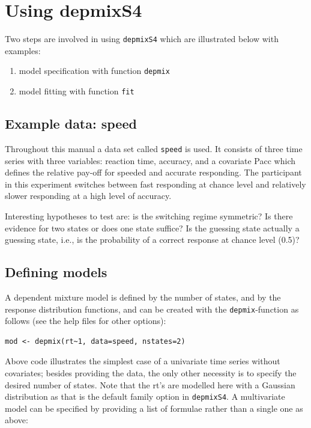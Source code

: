 \documentclass[a4paper]{article}
\newcommand{\pkg}{\texttt}
\newcommand{\code}{\texttt}
\begin{document}
\section{Using depmixS4}

Two steps are involved in using \pkg{depmixS4} which are illustrated
below with examples:
\begin{enumerate}
	\item model specification with function \code{depmix}
	
	\item  model fitting with function \code{fit}
\end{enumerate}

\subsection{Example data: speed}

Throughout this manual a data set called \code{speed} is used.  It
consists of three time series with three variables: reaction time,
accuracy, and a covariate Pacc which defines the relative pay-off for
speeded and accurate responding. The participant in this experiment 
switches between fast responding at chance level and relatively 
slower responding at a high level of accuracy. 

Interesting hypotheses to test are: is the switching regime symmetric?
Is there evidence for two states or does one state suffice?  Is the
guessing state actually a guessing state, i.e., is the probability
of a correct response at chance level (0.5)?


\subsection{Defining models}

A dependent mixture model is defined by the number of states, and by
the response distribution functions, and can be created with the
\code{depmix}-function as follows (see the help files for other
options):

\begin{verbatim} 
mod <- depmix(rt~1, data=speed, nstates=2)
\end{verbatim}

Above code illustrates the simplest case of a univariate time series
without covariates; besides providing the data, the only other
necessity is to specify the desired number of states. Note that the
rt's are modelled here with a Gaussian distribution as that is the
default family option in \pkg{depmixS4}. A multivariate model can be
specified by providing a list of formulae rather than a single one as
above:
\end{document}
